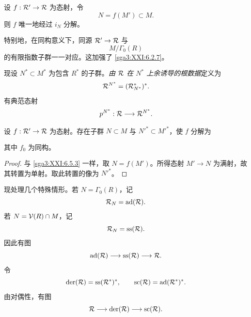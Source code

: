 \begin{lemma}\label{sga3:XXI:6.5.3}
设 \(f:\mathcal{R}'\to\mathcal{R}\) 为态射，令
\[
 N=f(M')\subset M.
\]
则 \(f\) 唯一地经过 \(i_N\) 分解。
\end{lemma}

特别地，在同构意义下，同源 \(\mathcal{R}'\to\mathcal{R}\) 与
\[
 M/\Gamma_0(R)
\]
的有限指数子群一一对应。这加强了 \ref{sga3:XXI:6.2.7}。

现设 \(N^\ast\subset M^\ast\) 为包含 \(R^\ast\) 的子群。\emph{由 \(\mathcal{R}\) 在 \(N^\ast\) 上余诱导的根数据}定义为
\[
 \mathcal{R}^{N^\ast}=(\mathcal{R}^\ast_{N^\ast})^\ast.
\]
有典范态射
\[
 p^{N^\ast}:\mathcal{R}\longrightarrow\mathcal{R}^{N^\ast}.
\]

\begin{lemma}\label{sga3:XXI:6.5.4}
设 \(f:\mathcal{R}'\to\mathcal{R}\) 为态射。存在子群 \(N\subset M\) 与 \(N'^\ast\subset M'^\ast\)，使 \(f\) 分解为
\begin{center}
\end{center}
其中 \(f_0\) 为同构。
\end{lemma}

\begin{proof}
与 \ref{sga3:XXI:6.5.3} 一样，取 \(N=f(M')\)。所得态射 \(M'\to N\) 为满射，故其转置为单射。取此转置的像为 \(N'^\ast\)。
\end{proof}

现处理几个特殊情形。若 \(N=\Gamma_0(R)\)，记
\[
 \mathcal{R}_N=\operatorname{ad}(\mathcal{R}).
\]
若 \(N=\mathcal{V}(R)\cap M\)，记
\[
 \mathcal{R}_N=\operatorname{ss}(\mathcal{R}).
\]
因此有图
\[
 \operatorname{ad}(\mathcal{R})\longrightarrow
 \operatorname{ss}(\mathcal{R})\longrightarrow\mathcal{R}.
\]
令
\[
 \operatorname{der}(\mathcal{R})=\operatorname{ss}(\mathcal{R}^\ast)^\ast,
 \qquad
 \operatorname{sc}(\mathcal{R})=\operatorname{ad}(\mathcal{R}^\ast)^\ast.
\]
由对偶性，有图
\[
 \mathcal{R}\longrightarrow
 \operatorname{der}(\mathcal{R})\longrightarrow
 \operatorname{sc}(\mathcal{R}).
\]

